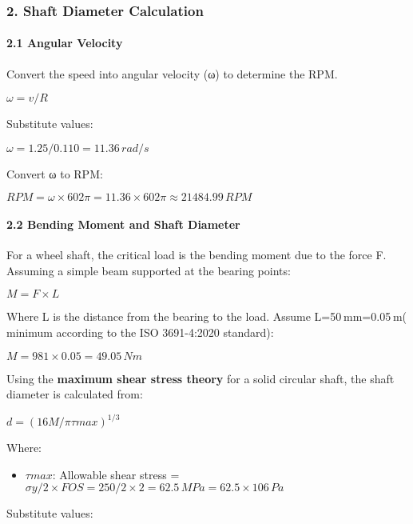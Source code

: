 \documentclass[../../main]{subfiles}
\begin{document}
\subsubsection{\texorpdfstring{\textbf{2. Shaft Diameter
Calculation}}{2. Shaft Diameter Calculation}}\label{shaft-diameter-calculation}

\paragraph{\texorpdfstring{\textbf{2.1 Angular
Velocity}}{2.1 Angular Velocity}}\label{angular-velocity}

Convert the speed into angular velocity (ω) to determine the RPM.

\(\omega = v/R\)

Substitute values:

\(\omega = 1.25/0.110 = 11.36\, rad/s\)

Convert ω to RPM:

\(RPM = \omega \times 602\pi = 11.36 \times 602\pi \approx 21484.99\, RPM\)

\paragraph{\texorpdfstring{\textbf{2.2 Bending Moment and Shaft
Diameter}}{2.2 Bending Moment and Shaft Diameter}}\label{bending-moment-and-shaft-diameter}

For a wheel shaft, the critical load is the bending moment due to the
force F. Assuming a simple beam supported at the bearing points:

\(M = F \times L\)

Where L is the distance from the bearing to the load. Assume
L=50 mm=0.05 m( minimum according to the ISO 3691-4:2020 standard):

\(M = 981 \times 0.05 = 49.05\, Nm\)

Using the \textbf{maximum shear stress theory} for a solid circular
shaft, the shaft diameter is calculated from:

\(d = (16M/\pi\tau max)^{1/3}\)

Where:

\begin{itemize}
\item
  \(\tau max\): Allowable shear stress =
  \(\sigma y/2 \times FOS = 250/2 \times 2 = 62.5\, MPa = 62.5 \times 106\, Pa\)
\end{itemize}

Substitute values:
\end{document}
